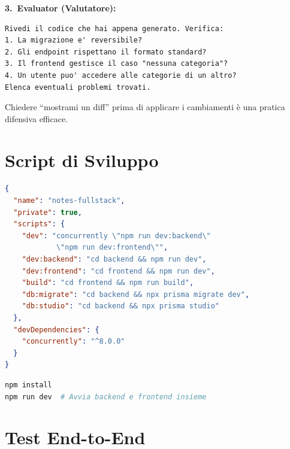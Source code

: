 \textbf{3.\ Evaluator (Valutatore):}
\begin{lstlisting}[language={}]
Rivedi il codice che hai appena generato. Verifica:
1. La migrazione e' reversibile?
2. Gli endpoint rispettano il formato standard?
3. Il frontend gestisce il caso "nessuna categoria"?
4. Un utente puo' accedere alle categorie di un altro?
Elenca eventuali problemi trovati.
\end{lstlisting}

\begin{tipbox}
Chiedere ``mostrami un diff'' prima di applicare i cambiamenti è una pratica difensiva efficace.
\end{tipbox}

\section{Script di Sviluppo}

\begin{praticabox}[title={Pratica --- Script npm nella root}]
\begin{lstlisting}[language=json,title={\texttt{package.json} di root}]
{
  "name": "notes-fullstack",
  "private": true,
  "scripts": {
    "dev": "concurrently \"npm run dev:backend\"
            \"npm run dev:frontend\"",
    "dev:backend": "cd backend && npm run dev",
    "dev:frontend": "cd frontend && npm run dev",
    "build": "cd frontend && npm run build",
    "db:migrate": "cd backend && npx prisma migrate dev",
    "db:studio": "cd backend && npx prisma studio"
  },
  "devDependencies": {
    "concurrently": "^8.0.0"
  }
}
\end{lstlisting}
\begin{lstlisting}[language=bash]
npm install
npm run dev  # Avvia backend e frontend insieme
\end{lstlisting}
\end{praticabox}

\section{Test End-to-End}

